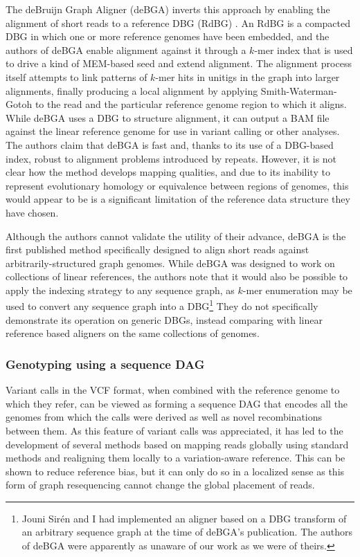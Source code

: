 The deBruijn Graph Aligner (deBGA) inverts this approach by enabling the alignment of short reads to a reference DBG (RdBG) \cite{liu2016debga}.
An RdBG is a compacted DBG in which one or more reference genomes have been embedded, and the authors of deBGA enable alignment against it through a $k$-mer index that is used to drive a kind of MEM-based seed and extend alignment.
The alignment process itself attempts to link patterns of $k$-mer hits in unitigs in the graph into larger alignments, finally producing a local alignment by applying Smith-Waterman-Gotoh to the read and the particular reference genome region to which it aligns.
While deBGA uses a DBG to structure alignment, it can output a BAM file against the linear reference genome for use in variant calling or other analyses.
The authors claim that deBGA is fast and, thanks to its use of a DBG-based index, robust to alignment problems introduced by repeats.
However, it is not clear how the method develops mapping qualities, and due to its inability to represent evolutionary homology or equivalence between regions of genomes, this would appear to be is a significant limitation of the reference data structure they have chosen.

Although the authors cannot validate the utility of their advance, deBGA is the first published method specifically designed to align short reads against arbitrarily-structured graph genomes.
While deBGA was designed to work on collections of linear references, the authors note that it would also be possible to apply the indexing strategy to any sequence graph, as $k$-mer enumeration may be used to convert any sequence graph into a DBG\footnote{Jouni Sir\'{e}n and I had implemented an aligner based on a DBG transform of an arbitrary sequence graph at the time of deBGA's publication. The authors of deBGA were apparently as unaware of our work as we were of theirs.}
They do not specifically demonstrate its operation on generic DBGs, instead comparing with linear reference based aligners on the same collections of genomes.

\subsubsection{Genotyping using a sequence DAG}
\label{sec:seq_dag_vcf}
Variant calls in the VCF format, when combined with the reference genome to which they refer, can be viewed as forming a sequence DAG that encodes all the genomes from which the calls were derived as well as novel recombinations between them.
As this feature of variant calls was appreciated, it has led to the development of several methods based on mapping reads globally using standard methods and realigning them locally to a variation-aware reference.
This can be shown to reduce reference bias, but it can only do so in a localized sense as this form of graph resequencing cannot change the global placement of reads.

